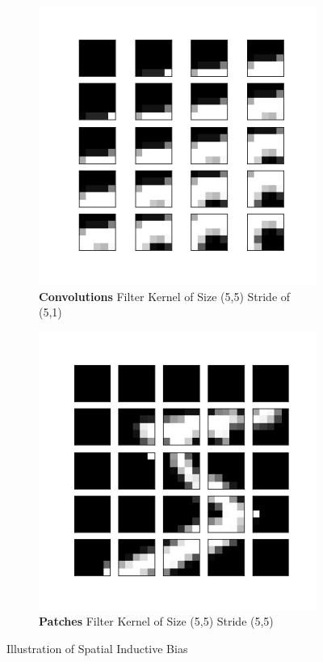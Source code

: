 \begin{figure}
\begin{subfigure}[b]{0.2\textwidth}
        \includegraphics[height=\textwidth]{figures/research_methadology/mnist_five_convolved.png}
        \caption{\textbf{Convolutions} Filter Kernel of Size (5,5) Stride of (5,1)}
    \end{subfigure}
    \hspace{10mm}
    \begin{subfigure}[b]{0.2\textwidth}
        \includegraphics[height=\textwidth]{figures/research_methadology/mnist_five_patched.png}
        \caption{\textbf{Patches} Filter Kernel of Size (5,5) Stride (5,5)}
    \end{subfigure}
    \caption{Illustration of Spatial Inductive Bias}
    \label{fig:Inductive Bias EG}
\end{figure}

